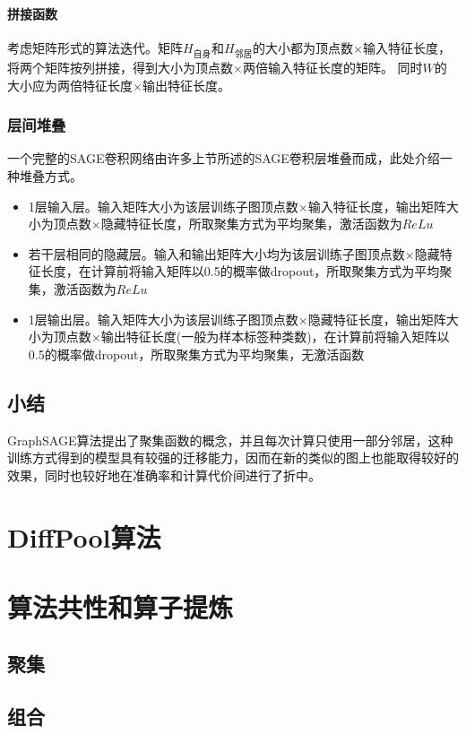 \paragraph{拼接函数}
考虑矩阵形式的算法迭代。矩阵$H_{自身}$和$H_{邻居}$的大小都为顶点数$\times$输入特征长度，将两个矩阵按列拼接，得到大小为顶点数$\times$两倍输入特征长度的矩阵。
同时$W$的大小应为两倍特征长度$\times$输出特征长度。

\subsubsection{层间堆叠}
一个完整的SAGE卷积网络由许多上节所述的SAGE卷积层堆叠而成，此处介绍一种堆叠方式。

\begin{itemize}
    \item 1层输入层。输入矩阵大小为该层训练子图顶点数$\times$输入特征长度，输出矩阵大小为顶点数$\times$隐藏特征长度，所取聚集方式为平均聚集，激活函数为$ReLu$
    \item 若干层相同的隐藏层。输入和输出矩阵大小均为该层训练子图顶点数$\times$隐藏特征长度，在计算前将输入矩阵以0.5的概率做dropout，所取聚集方式为平均聚集，激活函数为$ReLu$
    \item 1层输出层。输入矩阵大小为该层训练子图顶点数$\times$隐藏特征长度，输出矩阵大小为顶点数$\times$输出特征长度(一般为样本标签种类数)，在计算前将输入矩阵以0.5的概率做dropout，所取聚集方式为平均聚集，无激活函数
\end{itemize}

\subsection{小结}
GraphSAGE算法提出了聚集函数的概念，并且每次计算只使用一部分邻居，这种训练方式得到的模型具有较强的迁移能力，因而在新的类似的图上也能取得较好的效果，同时也较好地在准确率和计算代价间进行了折中。

\section{DiffPool算法}

\section{算法共性和算子提炼}

\subsection{聚集}

\subsection{组合}
